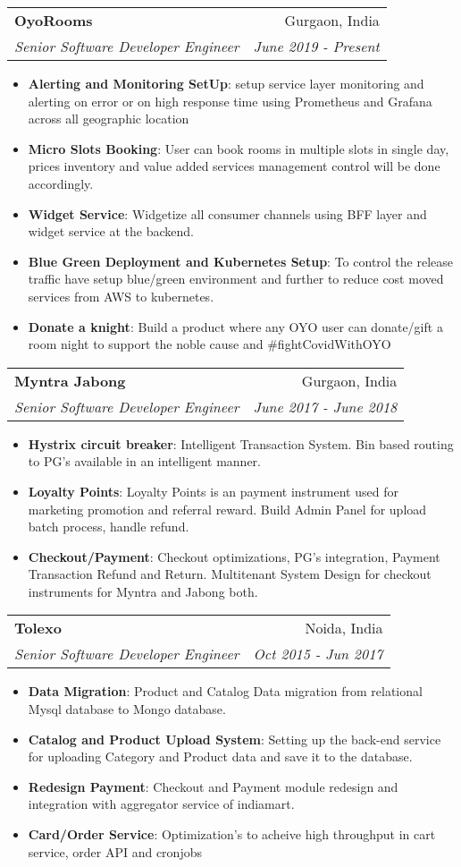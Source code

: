 \documentclass[letterpaper,11pt]{article}
\makeatletter
\newcommand{\resumeItem}[2]{
  \item\small{
    \textbf{#1}{: #2 \vspace{-2pt}}
  }
}
\newcommand{\resumeSubheading}[4]{
  \vspace{-1pt}\item
    \begin{tabular*}{0.97\textwidth}{l@{\extracolsep{\fill}}r}
      \textbf{#1} & #2 \\
      \textit{\small#3} & \textit{\small #4} \\
    \end{tabular*}\vspace{-5pt}
}
\newcommand{\resumeItemListStart}{\begin{itemize}}
\newcommand{\resumeItemListEnd}{\end{itemize}\vspace{-5pt}}
\makeatother
\begin{document}
    \resumeSubheading
      {OyoRooms}{Gurgaon, India}
      {Senior Software Developer Engineer}{June 2019 - Present}
      \resumeItemListStart
        \resumeItem{Alerting and Monitoring SetUp}
          {setup service layer monitoring and alerting on error or on high response time using Prometheus and Grafana across all geographic location}
        \resumeItem{Micro Slots Booking}
          {User can book rooms in multiple slots in single day, prices inventory and value added services management control will be done accordingly.}
        \resumeItem{Widget Service}
          {Widgetize all consumer channels using BFF layer and  widget service at the backend.}
         \resumeItem{Blue Green Deployment and Kubernetes Setup}
          {To control the release traffic have setup blue/green environment and further to reduce cost moved services from AWS to kubernetes. }
           \resumeItem{Donate a knight}
          {Build a product where any OYO user can donate/gift a room night to support the noble cause and #fightCovidWithOYO }
      \resumeItemListEnd
    \resumeSubheading
      {Myntra Jabong}{Gurgaon, India}
      {Senior Software Developer Engineer}{June 2017 - June 2018}
      \resumeItemListStart
        \resumeItem{Hystrix circuit breaker}
          {Intelligent Transaction System. Bin based routing to PG's available in an intelligent manner.}
        \resumeItem{Loyalty Points}
          {Loyalty Points is an payment instrument used for marketing promotion and referral reward. Build Admin Panel for upload batch process, handle refund.}
         \resumeItem{Checkout/Payment}
          {Checkout optimizations, PG’s integration, Payment Transaction Refund and Return. Multitenant System Design for checkout instruments for Myntra and Jabong both.}
      \resumeItemListEnd

    \resumeSubheading
      {Tolexo}{Noida, India}
      {Senior Software Developer Engineer}{Oct 2015 - Jun 2017}
      \resumeItemListStart
        \resumeItem{Data Migration}
          {Product and Catalog Data migration from relational Mysql database to Mongo database.}
        \resumeItem{Catalog and Product Upload System}
          {Setting up the back-end service for uploading Category and Product data and save it to the database.}
        \resumeItem{Redesign Payment}
          {Checkout and Payment module redesign and integration with aggregator service of indiamart.}
        \resumeItem{Card/Order Service}
          {Optimization's to acheive high throughput in cart service,  order API and  cronjobs}
      \resumeItemListEnd
\end{document}
